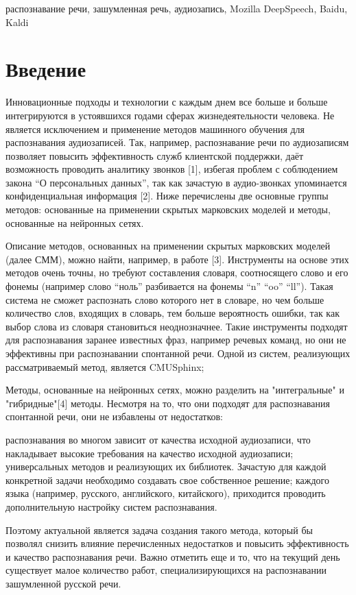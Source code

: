 \documentclass[conference]{IEEEtran}
\begin{document}
    \begin{IEEEkeywords}
        распознавание речи, зашумленная речь, аудиозапись, Mozilla DeepSpeech, Baidu, Kaldi
    \end{IEEEkeywords}


    \section{Введение}

    Инновационные подходы и технологии с каждым днем все больше и больше интегрируются в устоявшихся годами сферах жизнедеятельности человека.
    Не является исключением и применение методов машинного обучения для распознавания аудиозаписей.
    Так, например, распознавание речи по аудиозаписям позволяет повысить эффективность служб клиентской поддержки, даёт возможность проводить аналитику звонков [1],
    избегая проблем с соблюдением закона “О персональных данных”, так как зачастую в аудио-звонках упоминается конфиденциальная информация [2].
    Ниже перечислены две основные группы методов: основанные на применении скрытых марковских моделей и методы, основанные на нейронных сетях.

    Описание методов, основанных на применении скрытых марковских моделей (далее СММ), можно найти, например, в работе [3].
    Инструменты на основе этих методов очень точны, но требуют составления словаря, соотносящего слово и его фонемы (например слово “ноль” разбивается на фонемы “n” “oo” “ll”).
    Такая система не сможет распознать слово которого нет в словаре, но чем больше количество слов, входящих в словарь, тем больше вероятность ошибки, так как выбор слова из словаря становиться неоднозначнее.
    Такие инструменты подходят для распознавания заранее известных фраз, например речевых команд, но они не эффективны при распознавании спонтанной речи.
    Одной из систем, реализующих рассматриваемый метод, является CMUSphinx;

    Методы, основанные на нейронных сетях, можно разделить на "интегральные" и "гибридные"[4] методы.
    Несмотря на то, что они подходят для распознавания спонтанной речи, они не избавлены от недостатков:

    \begin{itemize}
         распознавания во многом зависит от качества исходной аудиозаписи, что накладывает высокие требования на качество исходной аудиозаписи;
         универсальных методов и реализующих их библиотек. Зачастую для каждой конкретной задачи необходимо создавать свое собственное решение;
         каждого языка (например, русского, английского, китайского), приходится проводить дополнительную настройку систем распознавания.
    \end{itemize}
    Поэтому актуальной является задача создания такого метода,
    который бы позволял снизить влияние перечисленных недостатков
    и повысить эффективность и качество распознавания речи.
    Важно отметить еще и то, что на текущий день существует малое количество работ,
    специализирующихся на распознавании зашумленной русской речи.
\end{document}
